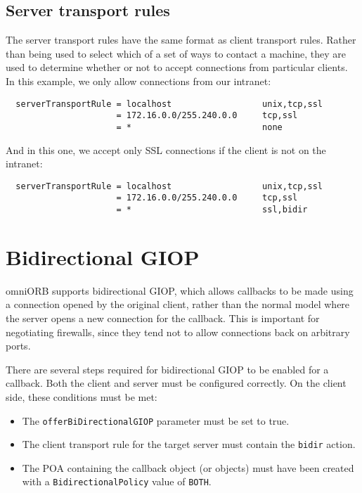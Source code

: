 \documentclass[11pt,twoside,a4paper]{book}
\newcommand{\code}[1]{\texttt{#1}}
\begin{document}
\subsection{Server transport rules}
\label{sec:serverRule}

The server transport rules have the same format as client transport
rules. Rather than being used to select which of a set of ways to
contact a machine, they are used to determine whether or not to accept
connections from particular clients. In this example, we only allow
connections from our intranet:

\begin{verbatim}
  serverTransportRule = localhost                  unix,tcp,ssl
                      = 172.16.0.0/255.240.0.0     tcp,ssl
                      = *                          none
\end{verbatim}

\noindent And in this one, we accept only SSL connections if the
client is not on the intranet:

\begin{verbatim}
  serverTransportRule = localhost                  unix,tcp,ssl
                      = 172.16.0.0/255.240.0.0     tcp,ssl
                      = *                          ssl,bidir
\end{verbatim}




\section{Bidirectional GIOP}
\label{sec:bidir}

omniORB supports bidirectional GIOP, which allows callbacks to be made
using a connection opened by the original client, rather than the
normal model where the server opens a new connection for the callback.
This is important for negotiating firewalls, since they tend not to
allow connections back on arbitrary ports.

There are several steps required for bidirectional GIOP to be enabled
for a callback. Both the client and server must be configured
correctly. On the client side, these conditions must be met:

\begin{itemize}

\item The \code{offerBiDirectionalGIOP} parameter must be set to true. 
\item The client transport rule for the target server must contain the
      \code{bidir} action.
\item The POA containing the callback object (or objects) must have
      been created with a \code{BidirectionalPolicy} value of
      \code{BOTH}.

\end{itemize}
\end{document}
